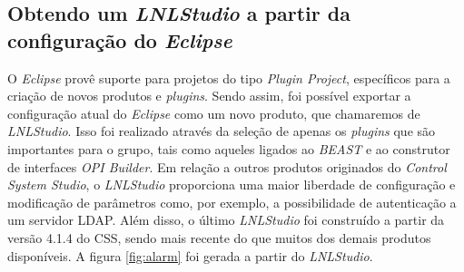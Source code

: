 \subsection {Obtendo um \textit{LNLStudio} a partir da configuração do
\textit{Eclipse}}

O \textit{Eclipse} provê suporte para projetos do tipo
\textit{Plugin Project}, específicos para a criação de novos produtos e
\textit{plugins}. Sendo assim, foi possível exportar a configuração atual do
\textit{Eclipse} como um novo produto, que chamaremos de \textit{LNLStudio}.
Isso foi realizado através da seleção de apenas os \textit{plugins} que são
importantes para o grupo, tais como aqueles ligados ao \textit{BEAST} e ao
construtor de interfaces \textit{OPI Builder}.  Em relação a outros produtos
originados do \textit{Control System Studio}, o \textit{LNLStudio} proporciona
uma maior liberdade de configuração e modificação de parâmetros como, por
exemplo, a possibilidade de autenticação a um servidor LDAP. Além disso, o
último \textit{LNLStudio} foi construído a partir da versão 4.1.4 do CSS, sendo
mais recente do que muitos dos demais produtos disponíveis. A figura
\ref{fig:alarm} foi gerada a partir do \textit{LNLStudio}.

 